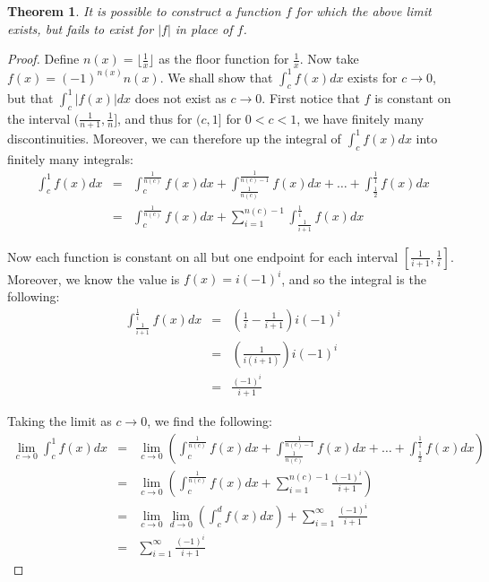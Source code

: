 \documentclass[psamsfonts]{amsart}
\newtheorem{thm}{Theorem}[section]
\theoremstyle{definition}
\theoremstyle{remark}
\numberwithin{equation}{section}
\begin{document}
\begin{thm}
It is possible to construct a function $f$ for which the above limit exists, but fails to exist for $|f|$ in place of $f$.
\end{thm}

\begin{proof}
Define $n(x)=\lfloor{\frac{1}{x}}\rfloor$ as the floor function for $\frac{1}{x}$. Now take $f(x) = (-1)^{n(x)} n(x)$. We shall show that $\int_c^1 f(x) dx$ exists for $c \to 0$, but that $\int_c^1 |f(x)| dx$ does not exist as $c \to 0$. First notice that $f$ is constant on the interval $(\frac{1}{n+1}, \frac{1}{n}]$, and thus for $(c,1]$ for $0 < c < 1$, we have finitely many discontinuities. Moreover, we can therefore up the integral of $\int_c^1 f(x) dx$ into finitely many integrals:
\begin{eqnarray}
\int_c^1 f(x) dx &=& \int_{c}^{\frac{1}{n(c)}} f(x) dx + \int_{\frac{1}{n(c)}}^{\frac{1}{n(c)-1}} f(x) dx + \ldots + \int_{\frac{1}{2}}^{\frac{1}{1}} f(x) dx \\
&=&\int_{c}^{\frac{1}{n(c)}} f(x) dx + \sum_{i=1}^{n(c)-1} \int_{\frac{1}{i+1}}^{\frac{1}{i}} f(x) dx
\end{eqnarray}

Now each function is constant on all but one endpoint for each interval $[\frac{1}{i+1}, \frac{1}{i} ]$. Moreover, we know the value is $f(x) = i (-1)^i$, and so the integral is the following:
\begin{eqnarray}
\int_{\frac{1}{i+1}}^{\frac{1}{i}} f(x) dx &=& \left( \frac{1}{i} - \frac{1}{i+1} \right) i (-1)^i \\
&=& \left(\frac{1}{i(i+1)} \right) i (-1)^i \\
&=& \frac{(-1)^i}{i+1}
\end{eqnarray}

Taking the limit as $c \to 0$, we find the following:
\begin{eqnarray}
\lim_{c \to 0} \int_c^1 f(x) dx &=& \lim_{c \to 0}  \left( \int_{c}^{\frac{1}{n(c)}} f(x) dx + \int_{\frac{1}{n(c)}}^{\frac{1}{n(c)-1}} f(x) dx + \ldots + \int_{\frac{1}{2}}^{\frac{1}{1}} f(x) dx \right)\\
&=& \lim_{c \to 0} \left(  \int_{c}^{\frac{1}{n(c)}} f(x) dx + \sum_{i=1}^{n(c)-1} \frac{(-1)^i}{i+1} \right)\\
&=& \lim_{c \to 0} \lim_{d \to 0}\left(  \int_c^d f(x) dx \right) + \sum_{i=1}^\infty \frac{(-1)^i}{i+1} \\
&=& \sum_{i=1}^\infty \frac{(-1)^i}{i+1} 
\end{eqnarray}


\end{proof}
\end{document}
